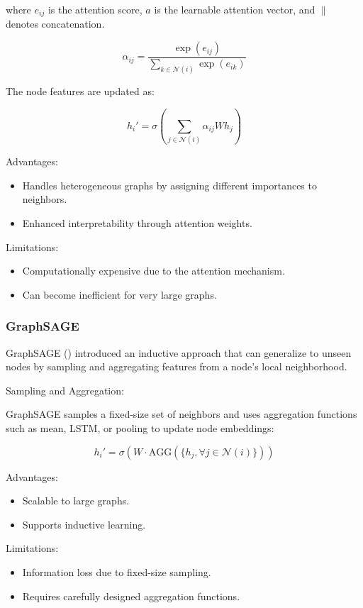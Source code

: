 where \( e_{ij} \) is the attention score, \( a \) is the learnable attention vector, and \( \| \) denotes concatenation.

\[ \alpha_{ij} = \frac{\exp(e_{ij})}{\sum_{k \in \mathcal{N}(i)} \exp(e_{ik})} \]

The node features are updated as:

\[ h_i' = \sigma\left(\sum_{j \in \mathcal{N}(i)} \alpha_{ij} W h_j\right) \]

Advantages:
\begin{itemize}
    \item Handles heterogeneous graphs by assigning different importances to neighbors.
    \item Enhanced interpretability through attention weights.
\end{itemize}


Limitations:
\begin{itemize}
    \item Computationally expensive due to the attention mechanism.
    \item Can become inefficient for very large graphs.
\end{itemize}

\subsubsection*{GraphSAGE}

GraphSAGE (\cite{Hamilton2017}) introduced an inductive approach that can generalize to unseen nodes by sampling and aggregating features from a node's local neighborhood.

Sampling and Aggregation:

GraphSAGE samples a fixed-size set of neighbors and uses aggregation functions such as mean, LSTM, or pooling to update node embeddings:

\[ h_i' = \sigma\left(W \cdot \text{AGG}\left(\{h_j, \forall j \in \mathcal{N}(i)\}\right)\right) \]

Advantages:
\begin{itemize}
    \item Scalable to large graphs.
    \item Supports inductive learning.
\end{itemize}


Limitations:
\begin{itemize}
    \item Information loss due to fixed-size sampling.
    \item Requires carefully designed aggregation functions.
\end{itemize}


